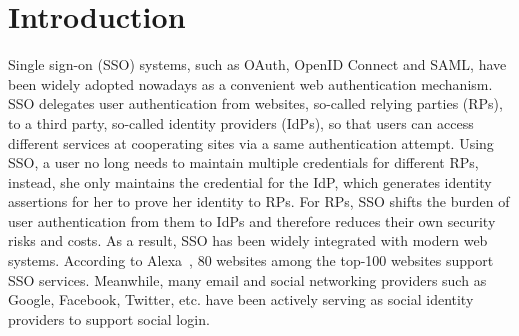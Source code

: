 \section{Introduction}
\label{sec:intro}




Single sign-on (SSO) systems, such as OAuth, OpenID Connect and SAML, have been widely adopted nowadays as a convenient web authentication mechanism. SSO delegates user authentication from websites, so-called relying parties (RPs), to a third party, so-called identity providers (IdPs), so that users can access different services at cooperating sites via a same authentication attempt. Using SSO, a user no long needs to maintain multiple credentials for different RPs, instead, she only maintains the credential for the IdP, which generates identity assertions for her to prove her identity to RPs.
For RPs, SSO shifts the burden of user authentication from them to IdPs and therefore reduces their own security risks and costs. As a result, SSO has been widely integrated with modern web systems.
According to Alexa~\cite{Alexa}, 80 websites among the top-100 websites support SSO services. Meanwhile, many email and social networking providers such as Google, Facebook, Twitter, etc. have been actively serving as social identity providers to support social login.


